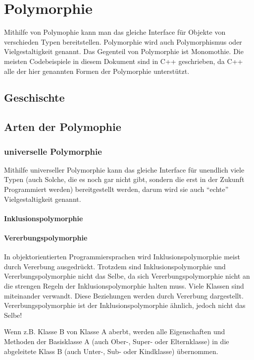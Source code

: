 \newpage
\section{Polymorphie}
	Mithilfe von Polymophie kann man das gleiche Interface für Objekte von verschieden Typen bereitstellen. Polymorphie wird
	auch Polymorphismus oder Vielgestaltigkeit genannt. Das Gegenteil von Polymorphie ist Monomothie. Die meisten Codebeispiele
	in diesem Dokument sind in C++ geschrieben, da C++ alle der hier genannten Formen der Polymorphie unterstützt.
	
	\subsection{Geschischte}
	
	\subsection{Arten der Polymophie}
		

		\subsubsection{universelle Polymorphie}
			Mithilfe universeller Polymorphie kann das gleiche Interface für unendlich viele Typen (auch Solche, die es noch
			gar nicht gibt, sondern die erst in der Zukunft Programmiert werden) bereitgestellt werden, darum wird sie auch
			``echte'' Vielgestaltigkeit genannt.
			
			\paragraph{Inklusionspolymorphie}
				
			
			\paragraph{Vererbungspolymorphie}
				In objektorientierten Programmiersprachen wird Inklusionspolymorphie meist durch Vererbung ausgedrückt.
				Trotzdem sind Inklusionspolymorphie und Vererbungspolymorphie nicht das Selbe, da sich Vererbungspolymorphie
				nicht an die strengen Regeln der Inklusionspolymorphie halten muss.
				Viele
				Klassen sind miteinander verwandt. Diese Beziehungen werden durch Vererbung dargestellt. Vererbungspolymorphie
				ist der Inklusionspolymorphie ähnlich, jedoch nicht das Selbe!
				
				Wenn z.B. Klasse B von Klasse A aberbt, werden alle Eigenschaften und Methoden der Basisklasse A (auch Ober-,
				Super- oder Elternklasse) in die abgeleitete Klass B (auch Unter-, Sub- oder Kindklasse) übernommen.
				
